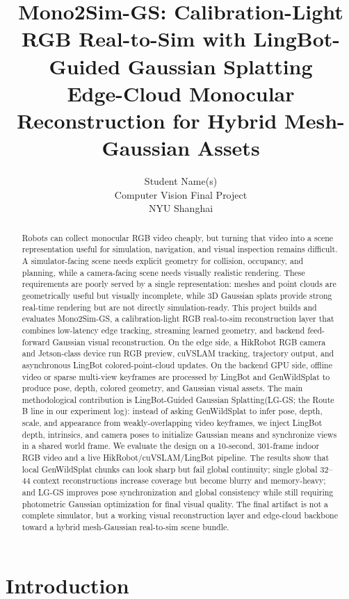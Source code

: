 \documentclass[11pt]{article}
\title{\vspace{-1.2em}\textbf{Mono2Sim-GS: Calibration-Light RGB Real-to-Sim with LingBot-Guided Gaussian Splatting}\\
\large Edge-Cloud Monocular Reconstruction for Hybrid Mesh-Gaussian Assets}
\author{
  Student Name(s)\\
  Computer Vision Final Project\\
  NYU Shanghai
}
\date{\vspace{-5ex}}
\newcommand{\projectname}{Mono2Sim-GS}
\newcommand{\methodname}{LingBot-Guided Gaussian Splatting\xspace}
\newcommand{\methodabbr}{LG-GS}
\newcommand{\RouteB}{\methodabbr\xspace}
\begin{document}
\maketitle
\thispagestyle{firstpage}

\begin{abstract}
Robots can collect monocular RGB video cheaply, but turning that video into a scene representation useful for simulation, navigation, and visual inspection remains difficult. A simulator-facing scene needs explicit geometry for collision, occupancy, and planning, while a camera-facing scene needs visually realistic rendering. These requirements are poorly served by a single representation: meshes and point clouds are geometrically useful but visually incomplete, while 3D Gaussian splats provide strong real-time rendering but are not directly simulation-ready. This project builds and evaluates \projectname, a calibration-light RGB real-to-sim reconstruction layer that combines low-latency edge tracking, streaming learned geometry, and backend feed-forward Gaussian visual reconstruction. On the edge side, a HikRobot RGB camera and Jetson-class device run RGB preview, cuVSLAM tracking, trajectory output, and asynchronous LingBot colored-point-cloud updates. On the backend GPU side, offline video or sparse multi-view keyframes are processed by LingBot and GenWildSplat to produce pose, depth, colored geometry, and Gaussian visual assets. The main methodological contribution is \methodname (\methodabbr; the Route B line in our experiment log): instead of asking GenWildSplat to infer pose, depth, scale, and appearance from weakly-overlapping video keyframes, we inject LingBot depth, intrinsics, and camera poses to initialize Gaussian means and synchronize views in a shared world frame. We evaluate the design on a 10-second, 301-frame indoor RGB video and a live HikRobot/cuVSLAM/LingBot pipeline. The results show that local GenWildSplat chunks can look sharp but fail global continuity; single global 32--44 context reconstructions increase coverage but become blurry and memory-heavy; and \RouteB improves pose synchronization and global consistency while still requiring photometric Gaussian optimization for final visual quality. The final artifact is not a complete simulator, but a working visual reconstruction layer and edge-cloud backbone toward a hybrid mesh-Gaussian real-to-sim scene bundle.
\end{abstract}

\section{Introduction}
\end{document}
